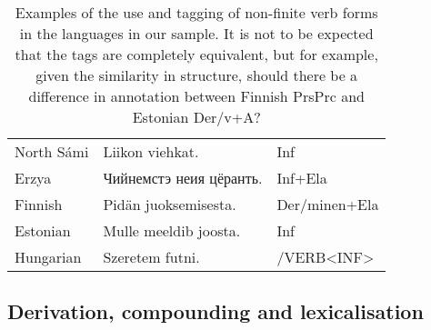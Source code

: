 \documentclass[free]{flammie}
\begin{document}
\begin{table}
\begin{scriptsize}
\begin{tabular}{lll}
North Sámi &   Liikon viehkat. & Inf \\
Erzya & Чийнемстэ неия цёранть. & Inf+Ela \\
Finnish & Pidän juoksemisesta.  & Der/minen+Ela  \\
Estonian & Mulle meeldib joosta. & Inf \\
Hungarian & Szeretem futni.& /VERB<INF> \\
\hline
\end{tabular}
\caption{Examples of the use and tagging of non-finite verb forms in the languages in our sample. It is not to be expected that the tags are completely equivalent, but for example, given the similarity in structure, should there be a difference in annotation between Finnish PrsPrc and Estonian Der/v+A?}
\label{table:non-finite}
\end{scriptsize}

\end{table}








\subsection{Derivation, compounding and lexicalisation}
\end{document}
